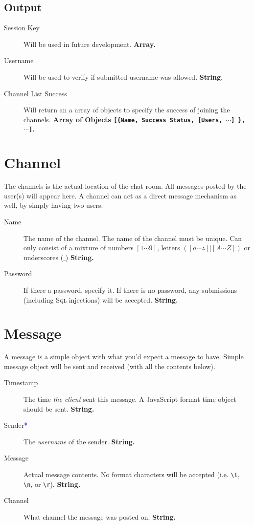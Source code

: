 \documentclass[oneside,12pt]{scrbook}
\newcommand{\reqalt}{\textcolor{blue}{*}}
\begin{document}
\section{Output}
\begin{description}
    \item[Session Key] Will be used in future development. \textbf{Array.}
    \item[Username] Will be used to verify if submitted username was allowed. \textbf{String.}
    \item[Channel List Success] Will return an a array of objects to specify the success of joining the channels. \textbf{Array of Objects \texttt{[\{Name, Success Status, [Users, $\cdots$] \}, $\cdots$]}.}
\end{description}


\chapter{Channel}\label{sec:channel}
The channels is the actual location of the chat room. All messages posted by the user(s) will appear here. A channel can act as a direct message mechanism as well, by simply having two users.

\begin{description}
    \item[Name] The name of the channel. The name of the channel must be unique. Can only consist of a mixture of numbers $[1 \cdots 9]$, letters $([a \cdots z] | [A \cdots Z])$ or underscores ($\_$)  \textbf{String.}
    \item[Password] If there a password, specify it. If there is no password, any submissions (including \textsc{Sql} injections) will be accepted. \textbf{String.}
\end{description}


\chapter{Message}
A message is a simple object with what you'd expect a message to have. Simple message object will be sent and received (with all the contents below).

\begin{description}
    \item[Timestamp] The time \textit{the client} sent this message. A JavaScript format time object should be sent. \textbf{String.}
    \item[Sender\reqalt] The \textit{username} of the sender. \textbf{String.}
    \item[Message] Actual message contents. No format characters will be accepted (i.e. \texttt{\textbackslash t}, \texttt{\textbackslash n}, or \texttt{\textbackslash r}). \textbf{String.}
    \item[Channel] What channel the message was posted on. \textbf{String.}
\end{description}
\end{document}
